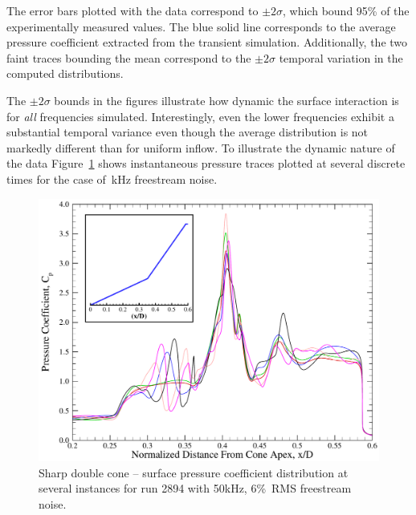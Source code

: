 The error bars plotted with the data correspond to $\pm 2\sigma$, which bound 95\% of the experimentally measured values.  The blue solid line corresponds to the average pressure coefficient extracted from the transient simulation.  Additionally, the two faint traces bounding the mean correspond to the $\pm 2\sigma$ temporal variation in the computed distributions.

The $\pm 2\sigma$ bounds in the figures illustrate how dynamic the surface interaction is for \emph{all} frequencies simulated.  Interestingly, even the lower frequencies exhibit a substantial  temporal variance even though the average distribution is not markedly different than for uniform inflow.  To illustrate the dynamic nature of the data Figure~\ref{fig:double_cone_AEDC_2894_unsteady_50kHz_6percent_Cptrace} shows instantaneous pressure traces plotted at several discrete times for the case of~\unit[50]{kHz} freestream noise. 
\begin{figure}[hbtp]
  \begin{center}
    \includegraphics[width=\textwidth]{figures/aedc_double_cone/2894/2894_50kHz_6RMS_Cptrace}
    \caption{Sharp double cone -- surface pressure coefficient distribution at several instances for run 2894 with \unit{50}{kHz}, 6\%~RMS freestream noise.\label{fig:double_cone_AEDC_2894_unsteady_50kHz_6percent_Cptrace}}
  \end{center}
\end{figure}


